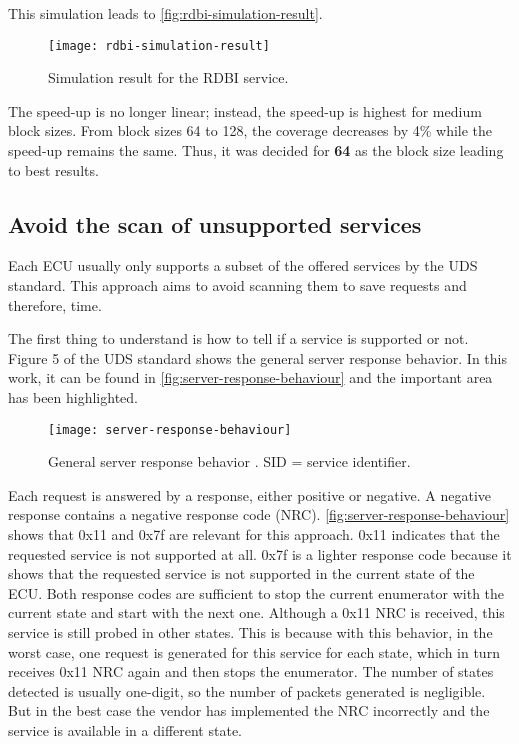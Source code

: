 This simulation leads to \autoref{fig:rdbi-simulation-result}.

\begin{figure}[h]
    \centering
    \texttt{[image: rdbi-simulation-result]}
    \caption{Simulation result for the RDBI service.}
    \label{fig:rdbi-simulation-result}
\end{figure}

The speed-up is no longer linear; instead, the speed-up is highest for medium block sizes. From block sizes 64 to 128, the coverage decreases by 4\% while the speed-up remains the same. Thus, it was decided for \textbf{64} as the block size leading to best results.


\subsection{Avoid the scan of unsupported services}

Each ECU usually only supports a subset of the offered services by the UDS standard. This approach aims to avoid scanning them to save requests and therefore, time.

The first thing to understand is how to tell if a service is supported or not. Figure 5 of the UDS standard shows the general server response behavior. In this work, it can be found in \autoref{fig:server-response-behaviour} and the important area has been highlighted.

\begin{figure}[h]
    \centering
    \texttt{[image: server-response-behaviour]}
    \caption{General server response behavior \cite{iso14229}. SID = service identifier.}
    \label{fig:server-response-behaviour}
\end{figure}

Each request is answered by a response, either positive or negative. A negative response contains a negative response code (NRC). \autoref{fig:server-response-behaviour} shows that 0x11 and 0x7f are relevant for this approach. 0x11 indicates that the requested service is not supported at all. 0x7f is a lighter response code because it shows that the requested service is not supported in the current state of the ECU. Both response codes are sufficient to stop the current enumerator with the current state and start with the next one. Although a 0x11 NRC is received, this service is still probed in other states. This is because with this behavior, in the worst case, one request is generated for this service for each state, which in turn receives 0x11 NRC again and then stops the enumerator. The number of states detected is usually one-digit, so the number of packets generated is negligible. But in the best case the vendor has implemented the NRC incorrectly and the service is available in a different state.

